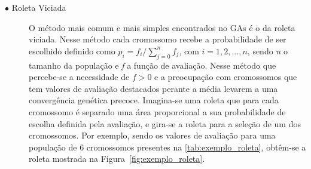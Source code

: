 \begin{description}
	\item[$\bullet$ Roleta Viciada] \text{}
	
O método mais comum e mais simples encontrados no GAs é o da roleta viciada. Nesse método cada cromossomo recebe a probabilidade de ser escolhido definido como \(p_i = f_i / \sum_{j=0}^{n}f_j\), com \(i = 1,2,\dots,n\), sendo \textit{n} o tamanho da população e \textit{f} a função de avaliação. Nesse método que percebe-se a necessidade de \(f > 0\) e a preocupação com cromossomos que tem valores de avaliação destacados perante a média levarem a uma convergência genética precoce. Imagina-se uma roleta que para cada cromossomo é separado uma área proporcional a sua probabilidade de escolha definida pela avaliação, e gira-se a roleta para a seleção de um dos cromossomos. Por exemplo, sendo os valores de avaliação para uma população de 6 cromossomos presentes na \autoref{tab:exemplo_roleta}, obtêm-se a roleta mostrada na Figura~\ref{fig:exemplo_roleta}.


\end{description}
